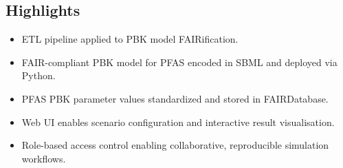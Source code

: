 \documentclass[preprint,12pt]{elsarticle}
\begin{document}
\begin{linenumbers}



\section*{Highlights} %
\begin{itemize}
  \item ETL pipeline applied to PBK model FAIRification. 
  \item FAIR-compliant PBK model for PFAS encoded in SBML and deployed via Python.
  \item PFAS PBK parameter values standardized and stored in FAIRDatabase. 
  \item Web UI enables scenario configuration and interactive result visualisation.
  \item Role-based access control enabling collaborative, reproducible simulation workflows.
\end{itemize}

%
\doublespacing


\end{linenumbers}
\end{document}
